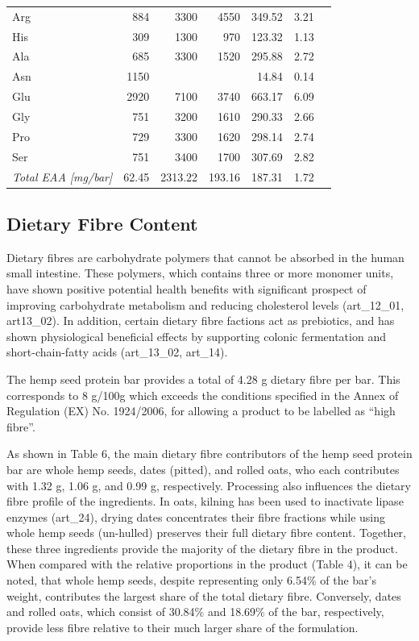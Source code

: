 \begin{table}[h]
\begin{tabular}{lrrrrrr}
    Arg & 884 & 3300 & 4550 & 349.52 & 3.21 \\
    His & 309 & 1300 & 970  & 123.32 & 1.13 \\
    Ala & 685 & 3300 & 1520 & 295.88 & 2.72 \\
    Asn & 1150&      &      & 14.84  & 0.14 \\
    Glu & 2920& 7100 & 3740 & 663.17 & 6.09 \\
    Gly & 751 & 3200 & 1610 & 290.33 & 2.66 \\
    Pro & 729 & 3300 & 1620 & 298.14 & 2.74 \\
    Ser & 751 & 3400 & 1700 & 307.69 & 2.82 \\
    \midrule
    \textit{Total EAA [mg/bar]} & 62.45 & 2313.22 & 193.16 & 187.31 & 1.72 \\
    \bottomrule
    \end{tabular}
\end{table}
    
\subsection{Dietary Fibre Content} 
Dietary fibres are carbohydrate polymers that cannot be absorbed in the human small intestine. These polymers, which contains three or more monomer units, have shown positive potential health benefits with significant prospect of improving carbohydrate metabolism and reducing cholesterol levels (art\_12\_01, art13\_02). In addition, certain dietary fibre factions act as prebiotics, and has shown physiological beneficial effects by supporting colonic fermentation and short-chain-fatty acids (art\_13\_02, art\_14). 

\vspace{1em}
The hemp seed protein bar provides a total of 4.28 g dietary fibre per bar. This corresponds to 8 g/100g which exceeds the conditions specified in the Annex of Regulation (EX) No. 1924/2006, for allowing a product to be labelled as “high fibre”.

\vspace{1em}
As shown in Table 6, the main dietary fibre contributors of the hemp seed protein bar are whole hemp seeds, dates (pitted), and rolled oats, who each contributes with 1.32 g, 1.06 g, and 0.99 g, respectively. Processing also influences the dietary fibre profile of the ingredients. In oats, kilning has been used to inactivate lipase enzymes (art\_24), drying dates concentrates their fibre fractions while using whole hemp seeds (un-hulled) preserves their full dietary fibre content. Together, these three ingredients provide the majority of the dietary fibre in the product. When compared with the relative proportions in the product (Table 4), it can be noted, that whole hemp seeds, despite representing only 6.54\% of the bar’s weight, contributes the largest share of the total dietary fibre. Conversely, dates and rolled oats, which consist of 30.84\% and 18.69\% of the bar, respectively, provide less fibre relative to their much larger share of the formulation.

